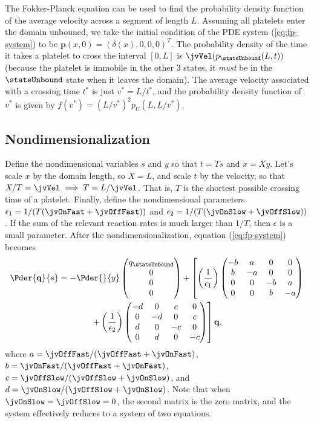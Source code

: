 The Fokker-Planck equation can be used to find the probability density
function of the average velocity across a segment of length
$L$. Assuming all platelets enter the domain unbouned, we take the
initial condition of the PDE system (\ref{eq:fp-system}) to be
$\mathbf{p}(x, 0) = (\delta(x), 0, 0, 0)^T$. The probability density
of the time it takes a platelet to cross the interval $[0, L]$ is
$\jvVel (p_{\stateUnbound}(L,t))$ (because the platelet is immobile in
the other 3 states, it \emph{must} be in the $\stateUnbound$ state
when it leaves the domain). The average velocity associated with a
crossing time $t^*$ is just $v^* = L/t^*$, and the probability density
function of $v^*$ is given by $f(v^*) = (L/v^*)^2 p_U(L,
L/v^*)$. 

\subsection{Nondimensionalization}
\label{sec:nondim}

Define the nondimensional variables $s$ and $y$ so that $t = Ts$ and
$x = Xy$. Let's scale $x$ by the domain length, so $X = L$, and scale
$t$ by the velocity, so that $X/T = \jvVel \implies T = L/\jvVel$. That
is, $T$ is the shortest possible crossing time of a platelet. Finally,
define the nondimensional parameters
$\epsilon_1 = 1/(T(\jvOnFast + \jvOffFast))$ and
$\epsilon_2 = 1/(T(\jvOnSlow + \jvOffSlow))$. If the sum of the relevant
reaction rates is much larger than $1/T$, then $\epsilon$ is a small
parameter. After the nondimensionalization, equation
(\ref{eq:fp-system}) becomes
\begin{multline}
  \label{eq:nd-system}
  \Pder{\mathbf{q}}{s} = -\Pder{}{y}
  \begin{pmatrix}
    q_{\stateUnbound} \\ 0 \\ 0 \\ 0
  \end{pmatrix}
  + \left[\left(\frac{1}{\epsilon_1}\right) 
  \begin{pmatrix}
    - b & a & 0 & 0 \\
    b & - a & 0 & 0 \\
    0 & 0 & - b & a \\
    0 & 0 & b & - a
  \end{pmatrix} \right.
  \\
  \left. + \left(\frac{1}{\epsilon_2}\right)
  \begin{pmatrix}
    - d & 0 & c & 0 \\
    0 & - d & 0 & c \\
    d & 0 & - c & 0 \\
    0 & d & 0 & - c
  \end{pmatrix}\right]
  \mathbf{q},
\end{multline}
where $a = \jvOffFast/(\jvOffFast + \jvOnFast)$,
$b = \jvOnFast/(\jvOffFast + \jvOnFast)$,
$c = \jvOffSlow/(\jvOffSlow + \jvOnSlow)$, and
$d = \jvOnSlow/(\jvOffSlow + \jvOnSlow)$. Note that when
$\jvOnSlow = \jvOffSlow = 0$, the second matrix is the zero matrix, and
the system effectively reduces to a system of two equations.

